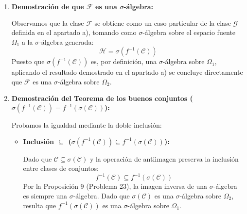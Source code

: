 \begin{problema}
\begin{enumerate}[label=\alph*)]
\begin{enumerate}[label=\arabic*.]
        \item \textit{Cierre por uniones numerables:}
        Sea $\{B_n\}_{n \in \mathbb{N}} \subseteq \mathcal{G}$ una colección numerable de conjuntos. Por definición de $\mathcal{G}$, $f^{-1}(B_n) \in \mathcal{H}$ para todo $n \in \mathbb{N}$.
        Dado que $\mathcal{H}$ es cerrada bajo uniones numerables y la antiimagen conmuta con la unión numerable:
        \[
            f^{-1}\left( \bigcup_{n=1}^\infty B_n \right) = \bigcup_{n=1}^\infty f^{-1}(B_n) \in \mathcal{H}
        \]
        Por consiguiente, $\bigcup_{n=1}^\infty B_n \in \mathcal{G}$.
    \end{enumerate}
    Queda probado que $\mathcal{G}$ es una $\sigma$-álgebra sobre $\Omega_2$.

    \item \textbf{Demostración de que $\mathcal{F}$ es una $\sigma$-álgebra:}
    
    Observamos que la clase $\mathcal{F}$ se obtiene como un caso particular de la clase $\mathcal{G}$ definida en el apartado a), tomando como $\sigma$-álgebra sobre el espacio fuente $\Omega_1$ a la $\sigma$-álgebra generada:
    \[
        \mathcal{H} = \sigma(f^{-1}(\mathcal{C}))
    \]
    Puesto que $\sigma(f^{-1}(\mathcal{C}))$ es, por definición, una $\sigma$-álgebra sobre $\Omega_1$, aplicando el resultado demostrado en el apartado a) se concluye directamente que $\mathcal{F}$ es una $\sigma$-álgebra sobre $\Omega_2$.

    \item \textbf{Demostración del Teorema de los buenos conjuntos ($\sigma(f^{-1}(\mathcal{C})) = f^{-1}(\sigma(\mathcal{C}))$):}

    Probamos la igualdad mediante la doble inclusión:

    \begin{itemize}
        \item \textbf{Inclusión $\subseteq$ ($\sigma(f^{-1}(\mathcal{C})) \subseteq f^{-1}(\sigma(\mathcal{C}))$):}
        
        Dado que $\mathcal{C} \subseteq \sigma(\mathcal{C})$ y la operación de antiimagen preserva la inclusión entre clases de conjuntos:
        \[
            f^{-1}(\mathcal{C}) \subseteq f^{-1}(\sigma(\mathcal{C}))
        \]
        Por la Proposición 9 (Problema 23), la imagen inversa de una $\sigma$-álgebra es siempre una $\sigma$-álgebra. Dado que $\sigma(\mathcal{C})$ es una $\sigma$-álgebra sobre $\Omega_2$, resulta que $f^{-1}(\sigma(\mathcal{C}))$ es una $\sigma$-álgebra sobre $\Omega_1$.
        

\end{itemize}
\end{enumerate}
\end{problema}
